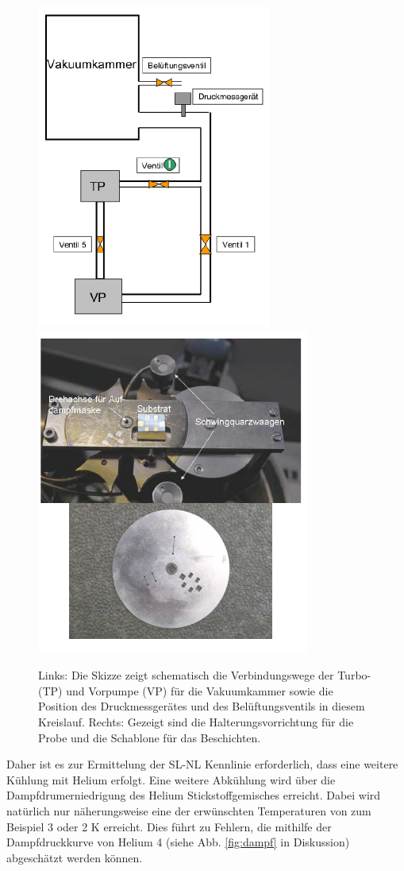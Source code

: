 \documentclass[twoside,        %
               BCOR12mm,       %
               english,ngerman, %
               fleqn,headsepline=false,footsepline=false
              ]{MFPREPORT}
\begin{document}
\begin{figure}
\centering
\includegraphics[scale=0.9]{vakuum.png}
\includegraphics[scale=0.9]{aufbau.png}
\caption{Links:
Die Skizze zeigt schematisch die Verbindungswege der Turbo-(TP) und Vorpumpe  (VP) für die
Vakuumkammer sowie die Position des Druckmessgerätes und des Belüftungsventils in diesem Kreislauf.
Rechts:
Gezeigt sind die Halterungsvorrichtung für die Probe und die Schablone für das Beschichten.
}
\label{fig:aufbau}
\end{figure}
Daher ist es zur Ermittelung der SL-NL Kennlinie erforderlich, dass eine weitere Kühlung mit Helium erfolgt. 
Eine weitere Abkühlung wird über die Dampfdrumerniedrigung des Helium Stickstoffgemisches erreicht.
Dabei wird natürlich nur näherungsweise eine der erwünschten Temperaturen von zum Beispiel 3 oder 2 K erreicht. Dies führt zu Fehlern, die mithilfe der Dampfdruckkurve von Helium 4 (siehe Abb. \ref{fig:dampf} in Diskussion) abgeschätzt werden können.
\end{document}

